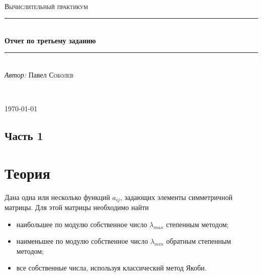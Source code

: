 

\usepackage{graphicx}



\begin{titlepage}

    \newcommand{\HRule}{\rule{\linewidth}{0.5mm}}

    \center

    \ \\[6.5cm]

    \textsc{\Large Вычислительный практикум}\\[0.5cm]

    \HRule\\[0.4cm]

    {\huge\bfseries Отчет по третьему заданию}\\[0.4cm]

    \HRule\\[0.5cm]

    \large
    \textit{Автор:} Павел \textsc{Соболев}

    \ \\[0.9cm]
    \vfill\vfill\vfill

    {\large\today}

    \vfill

\end{titlepage}

\subsection*{Часть 1}
\section*{Теория}

\vspace{18pt}

Дана одна или несколько функций $ a_{ij} $, задающих элементы симметричной матрицы. Для этой матрицы необходимо найти

\begin{itemize}
    \setlength{\itemsep}{1pt}
    \item наибольшее по модулю собственное число $ \lambda_{max} $ степенным методом;
    \item наименьшее по модулю собственное число $ \lambda_{min} $ обратным степенным методом;
    \item все собственные числа, используя классический метод Якоби.
\end{itemize}

